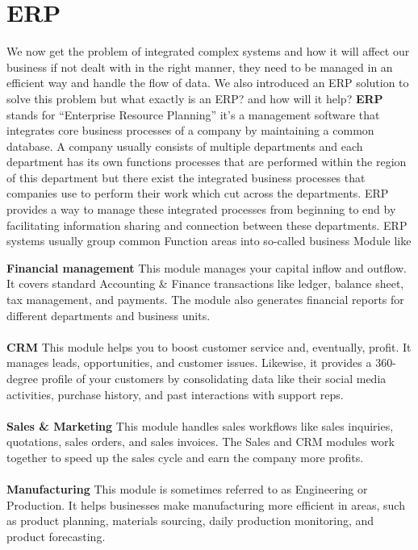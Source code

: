

\chapter{ERP}
We now get the problem of integrated complex systems and how it will affect our business if not dealt with in the 
right manner, they need to be managed in an efficient way and handle the flow of data. We also introduced an 
ERP solution to solve this problem but what exactly is an ERP? and how will it help? \newline \newline
\textbf{ERP} stands for “Enterprise Resource Planning”	 
it’s a management software that integrates core business processes of a company by maintaining a common database. \newline \newline
A company usually consists of multiple departments and each department has its own functions 
processes that are performed within the region of this department but there exist the integrated 
business processes that companies use to perform their work which cut across the departments. 
ERP provides a way to manage these integrated processes from beginning to end by facilitating information 
sharing and connection between these departments. \newline \newline
ERP systems usually group common Function areas into so-called business Module like\\

\begin{adjustwidth}{2cm}{}
\textbf{Financial management} This module manages your capital inflow and outflow. It covers standard Accounting \& Finance transactions like ledger, balance sheet, tax management, and payments. The module also generates financial reports for different departments and business units.\\\\
\textbf{CRM} This module helps you to boost customer service and, eventually, profit. It manages leads, opportunities, and customer issues. Likewise, it provides a 360-degree profile of your customers by consolidating data like their social media activities, purchase history, and past interactions with support reps.\\\\
\textbf{Sales \& Marketing} This module handles sales workflows like sales inquiries, quotations, sales orders, and sales invoices. The Sales and CRM modules work together to speed up the sales cycle and earn the company more profits.\\\\
\textbf{Manufacturing} This module is sometimes referred to as Engineering or Production. It helps businesses make manufacturing more efficient in areas, such as product planning, materials sourcing, daily production monitoring, and product forecasting.\\\\
\end{adjustwidth}

